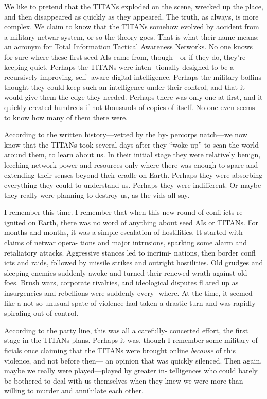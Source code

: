 We like to pretend that the TITANs exploded on 
the scene, wrecked up the place, and then disappeared 
as quickly as they appeared. The truth, as always, is 
more complex. We claim to know that the TITANs 
somehow evolved by accident from a military netwar 
system, or so the theory goes. That is what their name 
means: an acronym for Total Information Tactical 
Awareness Networks. No one knows for sure where 
these first seed AIs came from, though—or if they do, 
they're keeping quiet. Perhaps the TITANs were inten-
tionally designed to be a recursively improving, self-
aware digital intelligence. Perhaps the military boffins 
thought they could keep such an intelligence under 
their control, and that it would give them the edge 
they needed. Perhaps there was only one at first, and 
it quickly created hundreds if not thousands of copies 
of itself. No one even seems to know how many of 
them there were.

According to the written history—vetted by the hy-
percorps natch—we now know that the TITANs took 
several days after they ``woke up'' to scan the world 
around them, to learn about us. In their initial stage 
they were relatively benign, leeching network power 
and resources only where there was enough to spare 
and extending their senses beyond their cradle on 
Earth. Perhaps they were absorbing everything they 
could to understand us. Perhaps they were indifferent. 
Or maybe they really were planning to destroy us, as 
the vids all say.

I remember this time. I remember that when this 
new round of confl icts re-ignited on Earth, there 
was no word of anything about seed AIs or TITANs. 
For months and months, it was a simple escalation 
of hostilities. It started with claims of netwar opera-
tions and major intrusions, sparking some alarm and 
retaliatory attacks. Aggressive stances led to incrimi-
nations, then border confl icts and raids, followed by 
missile strikes and outright hostilities. Old grudges 
and sleeping enemies suddenly awoke and turned 
their renewed wrath against old foes. Brush wars, 
corporate rivalries, and ideological disputes fl ared up 
as insurgencies and rebellions were suddenly every-
where. At the time, it seemed like a not-so-unusual 
spate of violence had taken a drastic turn and was 
rapidly spiraling out of control.

According to the party line, this was all a carefully-
concerted effort, the first stage in the TITANs plans. 
Perhaps it was, though I remember some military of-
ficials once claiming that the TITANs were brought 
online \textit{because} of this violence, and not before then—
an opinion that was quickly silenced. Then again, 
maybe we really were played—played by greater in-
telligences who could barely be bothered to deal with 
us themselves when they knew we were more than 
willing to murder and annihilate each other.

